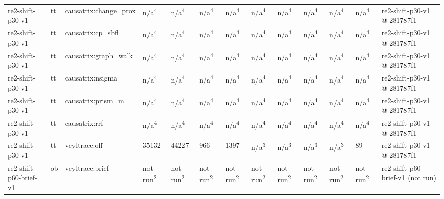 \begin{table}[t]
\begin{tabular}{lllllllllllll}
re2-shift-p30-v1 & tt & causatrix:change\_prox & n/a\textsuperscript{4} & n/a\textsuperscript{4} & n/a\textsuperscript{4} & n/a\textsuperscript{4} & n/a\textsuperscript{4} & n/a\textsuperscript{4} & n/a\textsuperscript{4} & n/a\textsuperscript{4} & n/a\textsuperscript{4} & re2-shift-p30-v1 @ 281787f1 \\
re2-shift-p30-v1 & tt & causatrix:cp\_sbfl & n/a\textsuperscript{4} & n/a\textsuperscript{4} & n/a\textsuperscript{4} & n/a\textsuperscript{4} & n/a\textsuperscript{4} & n/a\textsuperscript{4} & n/a\textsuperscript{4} & n/a\textsuperscript{4} & n/a\textsuperscript{4} & re2-shift-p30-v1 @ 281787f1 \\
re2-shift-p30-v1 & tt & causatrix:graph\_walk & n/a\textsuperscript{4} & n/a\textsuperscript{4} & n/a\textsuperscript{4} & n/a\textsuperscript{4} & n/a\textsuperscript{4} & n/a\textsuperscript{4} & n/a\textsuperscript{4} & n/a\textsuperscript{4} & n/a\textsuperscript{4} & re2-shift-p30-v1 @ 281787f1 \\
re2-shift-p30-v1 & tt & causatrix:nsigma & n/a\textsuperscript{4} & n/a\textsuperscript{4} & n/a\textsuperscript{4} & n/a\textsuperscript{4} & n/a\textsuperscript{4} & n/a\textsuperscript{4} & n/a\textsuperscript{4} & n/a\textsuperscript{4} & n/a\textsuperscript{4} & re2-shift-p30-v1 @ 281787f1 \\
re2-shift-p30-v1 & tt & causatrix:prism\_m & n/a\textsuperscript{4} & n/a\textsuperscript{4} & n/a\textsuperscript{4} & n/a\textsuperscript{4} & n/a\textsuperscript{4} & n/a\textsuperscript{4} & n/a\textsuperscript{4} & n/a\textsuperscript{4} & n/a\textsuperscript{4} & re2-shift-p30-v1 @ 281787f1 \\
re2-shift-p30-v1 & tt & causatrix:rrf & n/a\textsuperscript{4} & n/a\textsuperscript{4} & n/a\textsuperscript{4} & n/a\textsuperscript{4} & n/a\textsuperscript{4} & n/a\textsuperscript{4} & n/a\textsuperscript{4} & n/a\textsuperscript{4} & n/a\textsuperscript{4} & re2-shift-p30-v1 @ 281787f1 \\
re2-shift-p30-v1 & tt & veyltrace:off & 35132 & 44227 & 966 & 1397 & n/a\textsuperscript{3} & n/a\textsuperscript{3} & n/a\textsuperscript{3} & n/a\textsuperscript{3} & 89 & re2-shift-p30-v1 @ 281787f1 \\
re2-shift-p60-brief-v1 & ob & veyltrace:brief & not run\textsuperscript{2} & not run\textsuperscript{2} & not run\textsuperscript{2} & not run\textsuperscript{2} & not run\textsuperscript{2} & not run\textsuperscript{2} & not run\textsuperscript{2} & not run\textsuperscript{2} & not run\textsuperscript{2} & re2-shift-p60-brief-v1 (not run) \\

\end{tabular}
\end{table}
